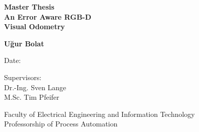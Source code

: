 \documentclass[a4paper]{report}
\numberwithin{figure}{section}
\begin{document}
\begin{titlepage}
\begin{center}


\vspace{1.5cm}


{\Huge \textbf{Master Thesis}}\\
\vspace{0.5cm}
{\huge \textbf{An Error Aware RGB-D \\Visual Odometry}}


\vspace{2.5cm}

{\huge \textbf{U\u{g}ur Bolat}}

\vfill

Date:

\vspace{1.2cm}

Supervisors: \\
Dr.-Ing. Sven Lange \\
M.Sc. Tim Pfeifer

\vspace{0.8cm}

Faculty of Electrical Engineering and Information Technology\\
Professorship of Process Automation

\end{center}
\end{titlepage}
\end{document}
